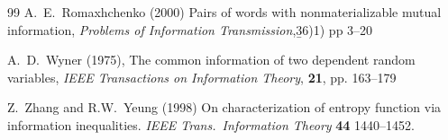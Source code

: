 \documentclass{IEEEtran}
\begin{document}
\begin{thebibliography}{99}
A.~E.~Romaxhchenko (2000)
Pairs of words with nonmaterializable mutual information,
\emph{Problems of Information Transmission},{\b 36})1) pp 3--20

A.~D.~Wyner (1975),
The common information of two dependent random variables,
\emph{IEEE Transactions on Information Theory}, {\bf 21}, pp. 163--179


 Z.~Zhang and R.W.~Yeung (1998)
    On characterization of entropy function via information inequalities.
    \emph{IEEE Trans.\ Information Theory} {\bf 44} 1440--1452.


\end{thebibliography}
\end{document}
